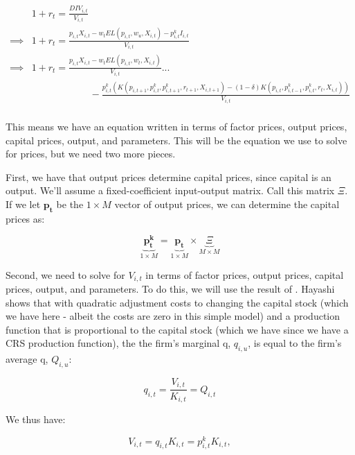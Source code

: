 \documentclass[letterpaper,12pt]{article}
\theoremstyle{definition}
\begin{document}
\begin{spacing}{1.5}
\begin{equation}
\label{eqn:price_det}
\begin{split}
& 1+r_{t} = \frac{DIV_{i,t}}{V_{i,t}} \\
\implies &  1+r_{t} = \frac{ p_{i,t}X_{i,t} - w_{t}EL(p_{i,t},w_{u},X_{i,t}) - p^{k}_{i,t}I_{i,t}}{V_{i,t}} \\
\implies &  1+r_{t} = \frac{ p_{i,t}X_{i,t} - w_{t}EL(p_{i,t},w_{t},X_{i,t})}{V_{i,t}}... \\
 & \quad\quad\quad\quad\quad\quad - \frac{p^{k}_{i,t}(K(p_{i,t+1},p^{k}_{i,t},p^{k}_{i,t+1},r_{t+1},X_{i,t+1}) - (1-\delta)K(p_{i,t},p^{k}_{i,t-1},p^{k}_{i,t},r_{t},X_{i,t}))}{V_{i,t}} \\
\end{split}
\end{equation}


This means we have an equation written in terms of factor prices, output prices, capital prices, output, and parameters.  This will be the equation we use to solve for prices, but we need two more pieces. 

First, we have that output prices determine capital prices, since capital is an output.  We'll assume a fixed-coefficient input-output matrix.  Call this matrix $\Xi$.  If we let $\boldsymbol{p_{t}}$ be the $1\times M$ vector of output prices, we can determine the capital prices as:

\begin{equation}
\label{eqn:capital_prices}
\underbrace{\boldsymbol{p^{k}_{t}}}_{1\times M} =\underbrace{\boldsymbol{p_{t}}}_{1\times M} \times  \underbrace{\Xi}_{M\times M}
\end{equation}

Second, we need to solve for $V_{i,t}$ in terms of factor prices, output prices, capital prices, output, and parameters.  To do this, we will use the result of \citet{Hayashi1982}.  Hayashi shows that with quadratic adjustment costs to changing the capital stock (which we have here - albeit the costs are zero in this simple model) and a production function that is proportional to the capital stock (which we have since we have a CRS production function), the the firm's marginal q, $q_{i,u}$, is equal to the firm's average q, $Q_{i,u}$:

\begin{equation}
q_{i,t} = \frac{V_{i,t}}{K_{i,t}} = Q_{i,t} 
\end{equation}

We thus have:

\begin{equation}
\label{eqn:solve_v1}
V_{i,t} = q_{i,t}K_{i,t} =p^{k}_{i,t}K_{i,t},
\end{equation}


\end{spacing}
\end{document}
